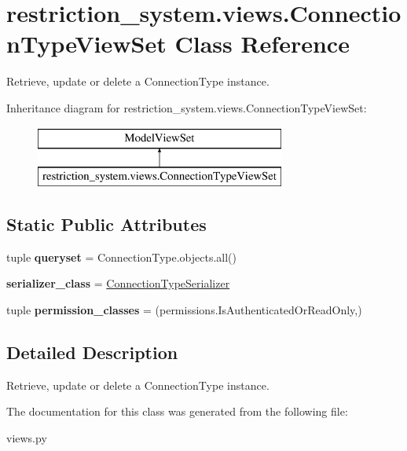 \hypertarget{classrestriction__system_1_1views_1_1ConnectionTypeViewSet}{}\section{restriction\+\_\+system.\+views.\+Connection\+Type\+View\+Set Class Reference}
\label{classrestriction__system_1_1views_1_1ConnectionTypeViewSet}


Retrieve, update or delete a Connection\+Type instance.  


Inheritance diagram for restriction\+\_\+system.\+views.\+Connection\+Type\+View\+Set\+:\begin{figure}[H]
\begin{center}
\leavevmode
\includegraphics[height=2.000000cm]{classrestriction__system_1_1views_1_1ConnectionTypeViewSet}
\end{center}
\end{figure}
\subsection*{Static Public Attributes}
\begin{DoxyCompactItemize}
\item 
\hypertarget{classrestriction__system_1_1views_1_1ConnectionTypeViewSet_a382b2a2eeccc01515c8ee37dd1f2df75}{}tuple {\bfseries queryset} = Connection\+Type.\+objects.\+all()\label{classrestriction__system_1_1views_1_1ConnectionTypeViewSet_a382b2a2eeccc01515c8ee37dd1f2df75}

\item 
\hypertarget{classrestriction__system_1_1views_1_1ConnectionTypeViewSet_a19b398fa98efa9cba2fca4f2a537fff9}{}{\bfseries serializer\+\_\+class} = \hyperlink{classrestriction__system_1_1serializers_1_1ConnectionTypeSerializer}{Connection\+Type\+Serializer}\label{classrestriction__system_1_1views_1_1ConnectionTypeViewSet_a19b398fa98efa9cba2fca4f2a537fff9}

\item 
\hypertarget{classrestriction__system_1_1views_1_1ConnectionTypeViewSet_a1f9c85d07bd0a744e90e756a3323d935}{}tuple {\bfseries permission\+\_\+classes} = (permissions.\+Is\+Authenticated\+Or\+Read\+Only,)\label{classrestriction__system_1_1views_1_1ConnectionTypeViewSet_a1f9c85d07bd0a744e90e756a3323d935}

\end{DoxyCompactItemize}


\subsection{Detailed Description}
Retrieve, update or delete a Connection\+Type instance. 



The documentation for this class was generated from the following file\+:\begin{DoxyCompactItemize}
\item 
views.\+py\end{DoxyCompactItemize}
